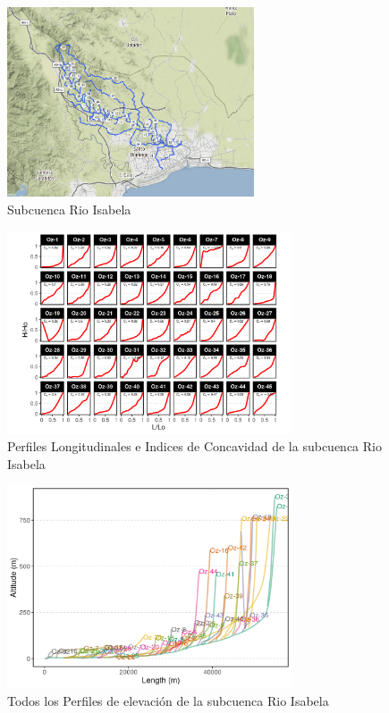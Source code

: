 \documentclass[11pt,]{article}
\begin{document}
\begin{figure}
\centering
\includegraphics[width=0.65000\textwidth]{Productos Generados/p_isabela.png}
\caption{\label{fig:LFP_Isabela0} Subcuenca Rio Isabela}
\end{figure}

\begin{figure}
\centering
\includegraphics[width=0.75000\textwidth]{Productos Generados/p_c_isabela1.png}
\caption{\label{fig:LFP_Isabela1} Perfiles Longitudinales e Indices de
Concavidad de la subcuenca Rio Isabela}
\end{figure}

\begin{figure}
\centering
\includegraphics[width=0.75000\textwidth]{Productos Generados/p_c_isabela.png}
\caption{\label{fig:LFP_Isabela2} Todos los Perfiles de elevación de la
subcuenca Rio Isabela}
\end{figure}
\end{document}
